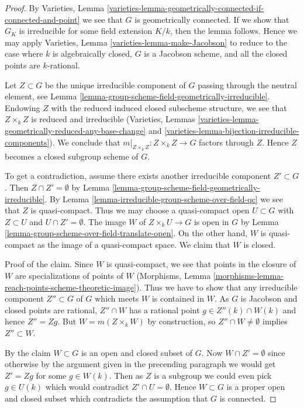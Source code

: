 \begin{proof}
By Varieties, Lemma
\ref{varieties-lemma-geometrically-connected-if-connected-and-point}
we see that $G$ is geometrically connected. If we show that $G_K$
is irreducible for some field extension $K/k$, then
the lemma follows. Hence we may apply
Varieties, Lemma \ref{varieties-lemma-make-Jacobson}
to reduce to the case where $k$ is algebraically closed,
$G$ is a Jacobson scheme, and all the closed points are $k$-rational.

\medskip\noindent
Let $Z \subset G$ be the unique irreducible component of $G$ passing
through the neutral element, see
Lemma \ref{lemma-group-scheme-field-geometrically-irreducible}.
Endowing $Z$ with the reduced induced closed subscheme structure,
we see that $Z \times_k Z$ is reduced and irreducible
(Varieties, Lemmas
\ref{varieties-lemma-geometrically-reduced-any-base-change} and
\ref{varieties-lemma-bijection-irreducible-components}).
We conclude that $m|_{Z \times_k Z} : Z \times_k Z \to G$ factors
through $Z$. Hence $Z$ becomes a closed subgroup scheme of $G$.

\medskip\noindent
To get a contradiction, assume there exists another irreducible
component $Z' \subset G$. Then $Z \cap Z' = \emptyset$ by
Lemma \ref{lemma-group-scheme-field-geometrically-irreducible}.
By Lemma \ref{lemma-irreducible-group-scheme-over-field-qc}
we see that $Z$ is quasi-compact. Thus we may choose a quasi-compact open
$U \subset G$ with $Z \subset U$ and $U \cap Z' = \emptyset$.
The image $W$ of $Z \times_k U \to G$ is open in $G$ by
Lemma \ref{lemma-group-scheme-over-field-translate-open}.
On the other hand, $W$ is quasi-compact as the image of a
quasi-compact space. We claim that $W$ is closed.

\medskip\noindent
Proof of the claim. Since $W$ is quasi-compact, we see that
points in the closure of $W$ are specializations of points of $W$
(Morphisms, Lemma \ref{morphisms-lemma-reach-points-scheme-theoretic-image}).
Thus we have to show that any irreducible
component $Z'' \subset G$ of $G$ which meets $W$ is contained in $W$.
As $G$ is Jacobson and closed points are rational,
$Z'' \cap W$ has a rational point
$g \in Z''(k) \cap W(k)$ and hence $Z'' = Zg$. But $W = m(Z \times_k W)$
by construction, so $Z'' \cap W \not = \emptyset$ implies
$Z'' \subset W$.

\medskip\noindent
By the claim $W \subset G$ is an open and closed subset of $G$.
Now $W \cap Z' = \emptyset$ since otherwise by the argument given in
the precending paragraph we would get $Z' = Zg$ for some $g \in W(k)$.
Then as $Z$ is a subgroup we could even pick $g \in U(k)$ which would
contradict $Z' \cap U = \emptyset$. Hence $W \subset G$ is a proper open
and closed subset which contradicts the assumption that $G$ is connected.
\end{proof}

